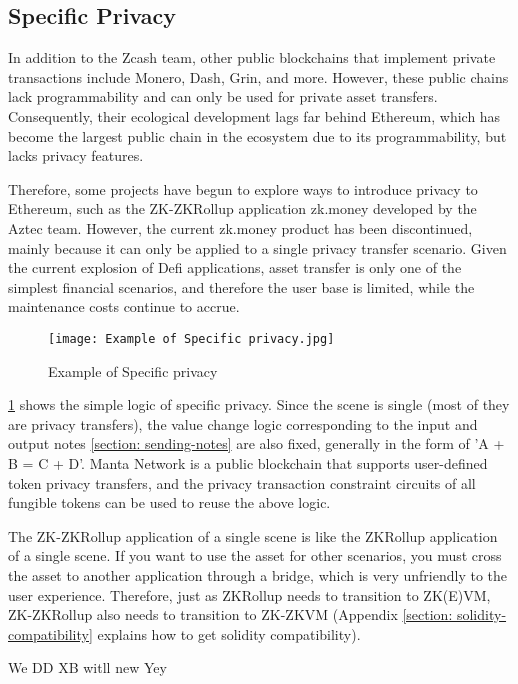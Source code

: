 \subsection{Specific Privacy}

In addition to the Zcash\cite{website:Zcash} team, other public blockchains that implement private transactions include Monero\cite{website:Monero}, Dash\cite{website:Dash}, Grin\cite{website:Grin}, and more. However, these public chains lack programmability and can only be used for private asset transfers. Consequently, their ecological development lags far behind Ethereum\cite{website:Ethereum}, which has become the largest public chain in the ecosystem due to its programmability, but lacks privacy features.

Therefore, some projects have begun to explore ways to introduce privacy to Ethereum\cite{website:Ethereum}, such as the ZK-ZKRollup application zk.money\cite{website:zk.money} developed by the Aztec\cite{website:Aztec} team. However, the current zk.money\cite{website:zk.money} product has been discontinued, mainly because it can only be applied to a single privacy transfer scenario. Given the current explosion of Defi applications, asset transfer is only one of the simplest financial scenarios, and therefore the user base is limited, while the maintenance costs continue to accrue.
\begin{figure}[!ht]
    \centering
    \texttt{[image: Example of Specific privacy.jpg]}
    \caption{Example of Specific privacy}
    \label{fig:Example of Specific privacy}
\end{figure}

\ref{fig:Example of Specific privacy} shows the simple logic of specific privacy. Since the scene is single (most of 
they are privacy transfers), the value change logic corresponding to the input and output 
notes \ref{section: sending-notes} are also fixed, generally in the form of 'A + B = C + D'. Manta Network\cite{website:Manta-network} is a 
public blockchain that supports user-defined token privacy transfers, and the privacy transaction 
constraint circuits of all fungible tokens can be used to reuse the above logic.

The ZK-ZKRollup application of a single scene is like the ZKRollup application of a 
single scene. If you want to use the asset for 
other scenarios, you must cross the asset to another application through a bridge, 
which is very unfriendly to the user experience. Therefore, just as ZKRollup needs to 
transition to ZK(E)VM, ZK-ZKRollup also needs to transition to ZK-ZKVM (Appendix \ref{section: solidity-compatibility} explains 
how to get solidity compatibility).


We DD XB witll new Yey 
